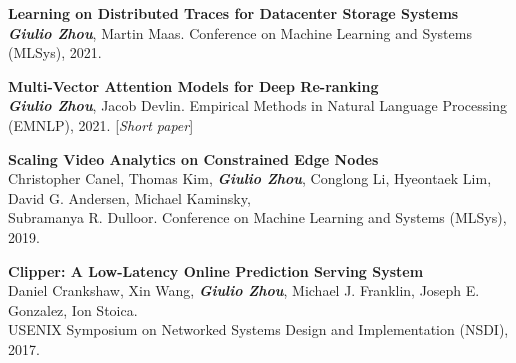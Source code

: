 \documentclass{article}
\begin{document}
\noindent
\textbf{Learning on Distributed Traces for Datacenter Storage Systems} \\
\indent
\hspace{-4.5mm}
{\small \textit{\textbf{Giulio Zhou}}, Martin Maas. Conference on Machine Learning and Systems (MLSys), 2021.} \\
\vspace{-3mm}

\noindent
\textbf{Multi-Vector Attention Models for Deep Re-ranking} \\
\indent
\hspace{-4.5mm}
{\small \textit{\textbf{Giulio Zhou}}, Jacob Devlin. Empirical Methods in Natural Language Processing (EMNLP), 2021. [\textit{Short paper}]} \\
\vspace{-3mm}


\noindent
\textbf{Scaling Video Analytics on Constrained Edge Nodes} \\
\indent
\hspace{-4.5mm}
{\small Christopher Canel, Thomas Kim, \textit{\textbf{Giulio Zhou}}, Conglong Li, Hyeontaek Lim, David G. Andersen, Michael Kaminsky, } \\
\indent
\hspace{-4.5mm}
{\small Subramanya R. Dulloor. Conference on Machine Learning and Systems (MLSys), 2019.} \\
\vspace{-3mm}

\noindent
\textbf{Clipper: A Low-Latency Online Prediction Serving System} \\
\indent
\hspace{-4.5mm}
{\small Daniel Crankshaw, Xin Wang, \textit{\textbf{Giulio Zhou}}, Michael J. Franklin, Joseph E. Gonzalez, Ion Stoica.} \\
\indent
\hspace{-4.5mm}
{\small USENIX Symposium on Networked Systems Design and Implementation (NSDI), 2017.} \\
\vspace{-2mm}
\end{document}
